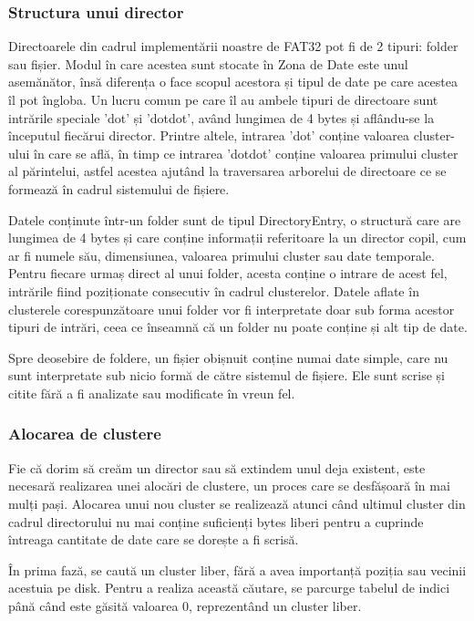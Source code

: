 \subsubsection{Structura unui director}

Directoarele din cadrul implementării noastre de FAT32 pot fi de 2 tipuri: folder sau fișier. Modul în care acestea sunt stocate în Zona de Date este unul asemănător, însă diferența o face scopul acestora și tipul de date pe care acestea îl pot îngloba. Un lucru comun pe care îl au ambele tipuri de directoare sunt intrările speciale 'dot' și 'dotdot', având lungimea de 4 bytes și aflându-se la începutul fiecărui director. Printre altele, intrarea 'dot' conține valoarea cluster-ului în care se află, în timp ce intrarea 'dotdot' conține valoarea primului cluster al părintelui, astfel acestea ajutând la traversarea arborelui de directoare ce se formează în cadrul sistemului de fișiere.

Datele conținute într-un folder sunt de tipul DirectoryEntry, o structură care are lungimea de 4 bytes și care conține informații referitoare la un director copil, cum ar fi numele său, dimensiunea, valoarea primului cluster sau date temporale. Pentru fiecare urmaș direct al unui folder, acesta conține o intrare de acest fel, intrările fiind poziționate consecutiv în cadrul clusterelor. Datele aflate în clusterele corespunzătoare unui folder vor fi interpretate doar sub forma acestor tipuri de intrări, ceea ce înseamnă că un folder nu poate conține și alt tip de date.

Spre deosebire de foldere, un fișier obișnuit conține numai date simple, care nu sunt interpretate sub nicio formă de către sistemul de fișiere. Ele sunt scrise și citite fără a fi analizate sau modificate în vreun fel.


\subsubsection{Alocarea de clustere}

Fie că dorim să creăm un director sau să extindem unul deja existent, este necesară realizarea unei alocări de clustere, un proces care se desfășoară în mai mulți pași. Alocarea unui nou cluster se realizează atunci când ultimul cluster din cadrul directorului nu mai conține suficienți bytes liberi pentru a cuprinde întreaga cantitate de date care se dorește a fi scrisă.

În prima fază, se caută un cluster liber, fără a avea importanță poziția sau vecinii acestuia pe disk. Pentru a realiza această căutare, se parcurge tabelul de indici până când este găsită valoarea 0, reprezentând un cluster liber.

